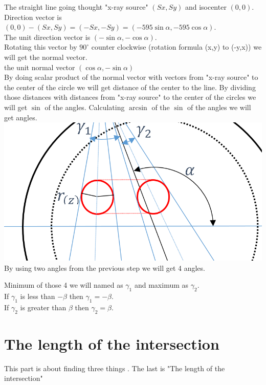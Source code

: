 \documentclass[12pt]{article}
\begin{document}
The straight line going thought "x-ray source" $(Sx,Sy)$ and isocenter $(0,0)$.\\
Direction vector is $(0,0)-(Sx,Sy)=(-Sx,-Sy)=(-595\sin{\alpha},-595\cos{\alpha})$.\\
The unit direction vector is  $(-\sin{\alpha},-\cos{\alpha})$. \\
Rotating this vector by $90^{\circ}$ counter clockwise (rotation formula (x,y) to (-y,x)) we will get the normal vector.\\
the unit normal vector $(\cos{\alpha},-\sin{\alpha})$\\

By doing scalar product of the normal vector with vectors from "x-ray source" to the center of the circle we will get distance of the center to the line.
By dividing those distances with distances from "x-ray source" to the center of the circles we will get $\sin$ of the angles.
Calculating $\arcsin$ of the $\sin$ of the angles we will get angles.\\

\includegraphics[scale=0.5]{pic04.png}\\

By using two angles from the previous step we will get 4 angles.

Minimum of those 4 we will named as $\gamma_1$ and maximum as  $\gamma_2$.\\
If $\gamma_1$ is less than $-\beta$ then $\gamma_1=-\beta$.\\
If $\gamma_2$ is greater than $\beta$ then $\gamma_2=\beta$.\\


\section{The length of the intersection}
This part is about finding three things . The last is "The length of the intersection"
\end{document}
